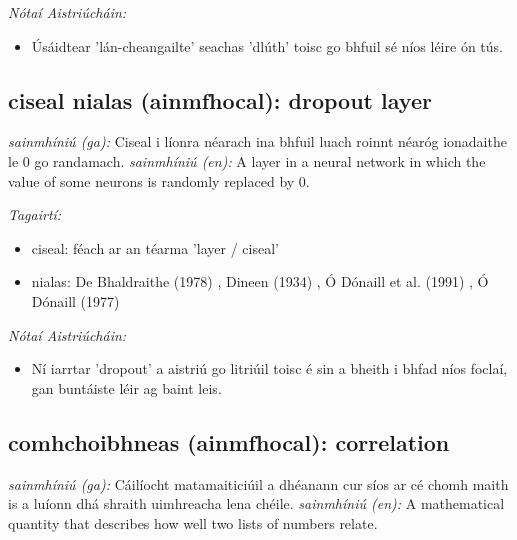 \documentclass{article}
\begin{document}
 \noindent \textit{Nótaí Aistriúcháin:}
\begin{itemize}
	\item Úsáidtear 'lán-cheangailte' seachas 'dlúth' toisc go bhfuil sé níos léire ón tús.
\end{itemize}


\subsection*{ciseal nialas (ainmfhocal): dropout layer} 
 \noindent \textit{sainmhíniú (ga):} Ciseal i líonra néarach ina bhfuil luach roinnt néaróg ionadaithe le 0 go randamach.
\newline\newline
 \noindent \textit{sainmhíniú (en):} A layer in a neural network in which the value of some neurons is randomly replaced by 0.
\newline

 \noindent \textit{Tagairtí:}
\begin{itemize}
	\item ciseal: féach ar an téarma 'layer / ciseal'
	\item nialas: De Bhaldraithe (1978) \cite{de-bhaldraithe}, Dineen (1934) \cite{dineen}, Ó Dónaill et al. (1991) \cite{focloir-beag}, Ó Dónaill (1977) \cite{odonaill}
\end{itemize}

 \noindent \textit{Nótaí Aistriúcháin:}
\begin{itemize}
	\item Ní iarrtar 'dropout' a aistriú go litriúil toisc é sin a bheith i bhfad níos foclaí, gan buntáiste léir ag baint leis.
\end{itemize}


\subsection*{comhchoibhneas (ainmfhocal): correlation} 
 \noindent \textit{sainmhíniú (ga):} Cáilíocht matamaiticiúil a dhéanann cur síos ar cé chomh maith is a luíonn dhá shraith uimhreacha lena chéile.
\newline\newline
 \noindent \textit{sainmhíniú (en):} A mathematical quantity that describes how well two lists of numbers relate.
\newline
\end{document}
